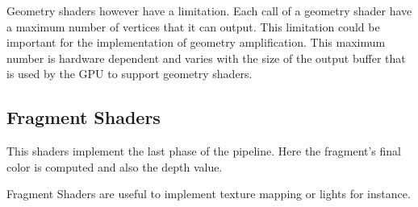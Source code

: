 Geometry shaders however have a limitation. Each call of a geometry shader have a maximum number of vertices that it can output. This limitation could be important for the implementation of geometry amplification. This maximum number is hardware dependent and varies with the size of the output buffer that is used by the GPU to support geometry shaders.


\subsection{Fragment Shaders} %
\label{sub:fragment_shaders}
This shaders implement the last phase of the pipeline. Here the fragment's final color is computed and also the depth value.

Fragment Shaders are useful to implement texture mapping or lights for instance.

